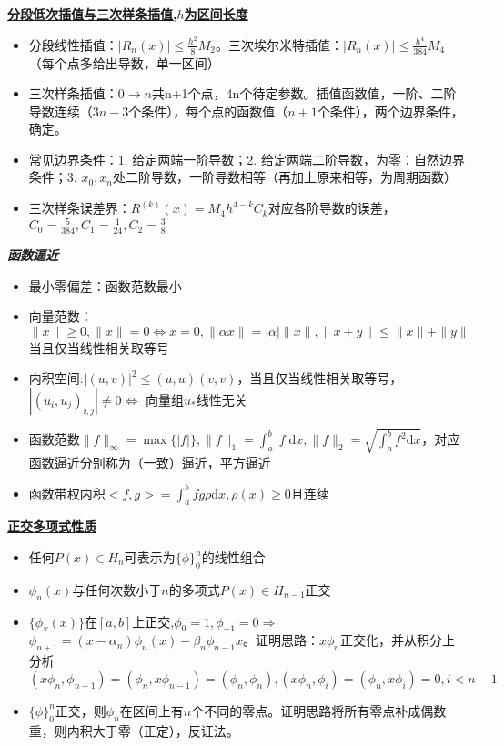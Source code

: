 \documentclass[UTF8,a4paper,landscape,8pt]{paper}
\renewcommand{\subsection}[1]{{\small\textbf{\underline{#1}}}\\ }
\renewcommand{\section}[1]{{\normalsize\textbf{\emph{#1}}}\\ }
\newcommand{\List}[1]{\begin{itemize}[fullwidth,itemindent=0em] #1 \end{itemize}}
\begin{document}
\begin{multicols}{4}
    \subsection{分段低次插值与三次样条插值,$h$为区间长度}
    \List{
        \item {分段线性插值：$|R_n(x)| \le \frac{h^2}{8}M_2$。三次埃尔米特插值：$|R_n(x)| \le \frac{h^4}{384}M_4$（每个点多给出导数，单一区间）}
        \item {三次样条插值：$0\rightarrow n$共n+1个点，4n个待定参数。插值函数值，一阶、二阶导数连续（$3n-3$个条件），每个点的函数值（$n + 1$个条件），两个边界条件，确定。}
        \item {常见边界条件：1. 给定两端一阶导数；2. 给定两端二阶导数，为零：自然边界条件；3. $x_0,x_n$处二阶导数，一阶导数相等（再加上原来相等，为周期函数） }
        \item {三次样条误差界：$R^{(k)}(x) = M_4 h^{4-k} C_k$对应各阶导数的误差，$C_0 = \frac{5}{384},C_1 = \frac{1}{24},C_2=\frac{3}{8}$}
    }
\section{函数逼近}
    \List{
        \item {最小零偏差：函数范数最小}
        \item {向量范数：$\|x\| \ge 0, \|x\| =0 \iff x = 0, \|\alpha x\| = |\alpha|\|x\|, \|x+y\| \le \|x\| + \|y\|$ 当且仅当线性相关取等号}
        \item {内积空间:$|(u,v)|^2 \le (u,u)(v,v)$，当且仅当线性相关取等号，$|(u_i,u_j)_{i,j}| \ne 0 \iff $ 向量组$u_*$线性无关 }
        \item {函数范数$\|f\|_\infty = \max\{|f|\}, \|f\|_1 = \int_a^b|f|\mathrm d x, \|f\|_2 = \sqrt{\int_a^bf^2\mathrm d x}$，对应函数逼近分别称为（一致）逼近，平方逼近}
        \item {函数带权内积$<f,g> = \int_a^bfg\rho\mathrm dx,\rho(x) \ge 0$且连续}
    }
    \subsection{正交多项式性质}
    \List{
        \item {任何$P(x)\in H_n$可表示为$\{\phi\}^n_0$的线性组合}
        \item {$\phi_n(x)$与任何次数小于$n$的多项式$P(x)\in H_{n-1}$正交}
        \item {$\{\phi_x(x)\}$在$[a,b]$上正交,$\phi_0 = 1,\phi_{-1} = 0 \Rightarrow$ \\ $ \phi_{n+1} = (x-\alpha_n)\phi_n(x)-\beta_n\phi_{n-1}x$。证明思路：$x\phi_n$正交化，并从积分上分析$(x\phi_n,\phi_{n-1}) = (\phi_n,x\phi_{n-1})=(\phi_n,\phi_n),(x\phi_n,\phi_{i}) = (\phi_n,x\phi_{i})=0,i < n-1$}
        \item {$\{\phi\}^n_0$正交，则$\phi_n$在区间上有$n$个不同的零点。证明思路将所有零点补成偶数重，则内积大于零（正定），反证法。}
    }

\end{multicols}
\end{document}
